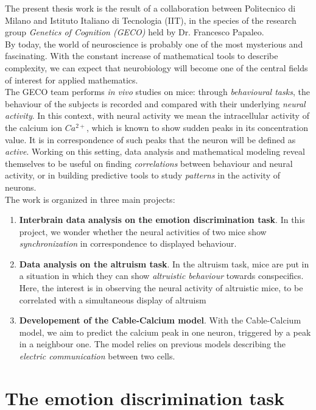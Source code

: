 \documentclass[11pt,a4paper,twocolumn]{article}
\begin{document}
 
The present thesis work is the result of a collaboration between Politecnico di Milano and Istituto Italiano di Tecnologia (IIT), in the species of the research group \textit{Genetics of Cognition (GECO)} held by Dr. Francesco Papaleo.\\
By today, the world of neuroscience is probably one of the most mysterious and fascinating. With the constant increase of mathematical tools to describe complexity,  we can expect that neurobiology will become one of the central fields of interest for applied mathematics.\\
The GECO team performs \textit{in vivo} studies on mice: through \textit{behavioural tasks}, the behaviour of the subjects is recorded and compared with their underlying \textit{neural activity}. In this context, with neural activity we mean the intracellular activity of the calcium ion $Ca^{2+}$, which is known to show sudden peaks in its concentration value. It is in correspondence of such peaks that the neuron will be defined as \textit{active}. Working on this setting, data analysis and mathematical modeling reveal themselves to be useful on finding \textit{correlations} between behaviour and neural activity, or in building predictive tools to study \textit{patterns} in the activity of neurons.\\
The work is organized in three main projects:
\begin{enumerate}
	\item \textbf{Interbrain data analysis on the emotion discrimination task}. In this project, we wonder whether the neural activities of two mice show \textit{synchronization} in correspondence to displayed behaviour.
	
	\item \textbf{Data analysis on the altruism task}. In the altruism task, mice are put in a situation in which they can show \textit{altruistic behaviour} towards conspecifics. Here, the interest is in observing the neural activity of altruistic mice, to be correlated with a simultaneous display of altruism
	
	\item \textbf{Developement of the Cable-Calcium model}. With the Cable-Calcium model, we aim to predict the calcium peak in one neuron, triggered by a peak in a neighbour one. The model relies on previous models describing the \textit{electric communication} between two cells.
\end{enumerate}



\section{The emotion discrimination task}
\end{document}
